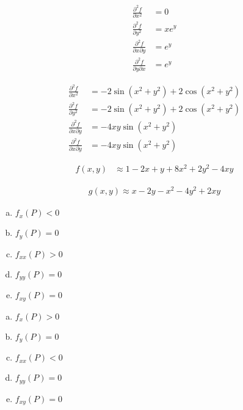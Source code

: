 \documentclass[10pt]{extarticle}
\begin{document}
  \begin{problem}{14.5}
    \begin{description}[font=\normalfont]
      \item[6:]
        \begin{align*}
          \frac{\partial^2 f}{\partial x^2} &= 0\\
          \frac{\partial^2 f}{\partial y^2} &= xe^y\\
          \frac{\partial^2f}{\partial x \partial y} &= e^y\\
          \frac{\partial^2 f}{\partial y \partial x} &= e^y
        \end{align*}
      \item[10:]
        \begin{align*}
          \frac{\partial^2 f}{\partial x^2} &= -2\sin(x^2 + y^2) + 2\cos(x^2 + y^2)\\
          \frac{\partial^2 f}{\partial y^2} &= -2\sin(x^2 + y^2) + 2\cos(x^2 + y^2)\\
          \frac{\partial^2 f}{\partial x \partial y} &= -4xy\sin(x^2 + y^2)\\
          \frac{\partial^2 f}{\partial x \partial y} &= -4xy\sin(x^2 + y^2)
        \end{align*}
      \item[16:]
        \begin{align*}
          f(x,y) &\approx 1 -2x + y + 8x^2 + 2y^2 -4xy
        \end{align*}
      \item[20:] 
        \begin{align*}
        g(x,y) \approx x-2y -x^2 -4y^2 + 2xy
        \end{align*}
      \item[22:]
        \begin{enumerate}[(a)]
          \item $f_x(P) < 0$
          \item $f_y(P) = 0$
          \item $f_{xx}(P) > 0$
          \item $f_{yy}(P) = 0$
          \item $f_{xy}(P) = 0$
        \end{enumerate}
      \item[24:]
        \begin{enumerate}[(a)]
          \item $f_x(P) > 0$
          \item $f_y(P) = 0$
          \item $f_{xx}(P) < 0$
          \item $f_{yy}(P) = 0$
          \item $f_{xy}(P) = 0$
        \end{enumerate}
    \end{description}
  \end{problem}
\end{document}
